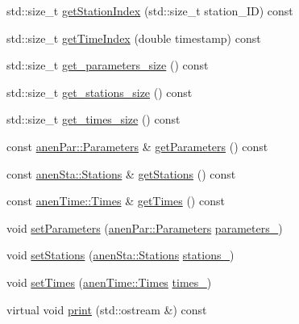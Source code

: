 \begin{DoxyCompactItemize}
\item 
std\+::size\+\_\+t \mbox{\hyperlink{class_observations_aa485e3d95a967b9b4efd5c4efaf0c9e1}{get\+Station\+Index}} (std\+::size\+\_\+t station\+\_\+\+ID) const
\item 
std\+::size\+\_\+t \mbox{\hyperlink{class_observations_a60c87d96be325c830c88d83bb60353ef}{get\+Time\+Index}} (double timestamp) const
\item 
std\+::size\+\_\+t \mbox{\hyperlink{class_observations_a4ae6818f6d01490eb14d63ce51a1d331}{get\+\_\+parameters\+\_\+size}} () const
\item 
std\+::size\+\_\+t \mbox{\hyperlink{class_observations_a30f67730e600545cf8cb9d7aed13bd33}{get\+\_\+stations\+\_\+size}} () const
\item 
std\+::size\+\_\+t \mbox{\hyperlink{class_observations_a352e34f7c278c86f54c69def24dabcd1}{get\+\_\+times\+\_\+size}} () const
\item 
const \mbox{\hyperlink{classanen_par_1_1_parameters}{anen\+Par\+::\+Parameters}} \& \mbox{\hyperlink{class_observations_a5347196195a72495217dc0614c9224c2}{get\+Parameters}} () const
\item 
const \mbox{\hyperlink{classanen_sta_1_1_stations}{anen\+Sta\+::\+Stations}} \& \mbox{\hyperlink{class_observations_a0f6deefe6b26a0546ea6d7642d190bfa}{get\+Stations}} () const
\item 
const \mbox{\hyperlink{classanen_time_1_1_times}{anen\+Time\+::\+Times}} \& \mbox{\hyperlink{class_observations_aa0929286a88fe261af73cc67c6c8df92}{get\+Times}} () const
\item 
void \mbox{\hyperlink{class_observations_a6965bc35582ce23ed840e9e6bf1fa228}{set\+Parameters}} (\mbox{\hyperlink{classanen_par_1_1_parameters}{anen\+Par\+::\+Parameters}} \mbox{\hyperlink{class_observations_a9e80eaaa9c096dda1dbbe8fcf631c087}{parameters\+\_\+}})
\item 
void \mbox{\hyperlink{class_observations_a01ddf7eb5d0b9c3fec31731a931cfdf4}{set\+Stations}} (\mbox{\hyperlink{classanen_sta_1_1_stations}{anen\+Sta\+::\+Stations}} \mbox{\hyperlink{class_observations_a03e2d3c69e46066f48e4381657a995f7}{stations\+\_\+}})
\item 
void \mbox{\hyperlink{class_observations_a28c65d41c60cb95607e06d090d03a8d2}{set\+Times}} (\mbox{\hyperlink{classanen_time_1_1_times}{anen\+Time\+::\+Times}} \mbox{\hyperlink{class_observations_ad379be63239b03e0db53dc31014a2d74}{times\+\_\+}})
\item 
virtual void \mbox{\hyperlink{class_observations_a523647c5ae644959f0ed583cd7b11aba}{print}} (std\+::ostream \&) const
\end{DoxyCompactItemize}
